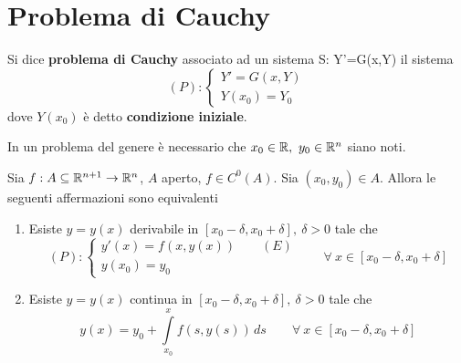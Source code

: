 \section{Problema di Cauchy}
\begin{definition}
    Si dice \textbf{problema di Cauchy} associato ad un sistema S: Y'=G(x,Y) il sistema
    \begin{equation*}
       (P): \begin{cases}
            Y'=G(x, Y)\\
            Y(x_0)=Y_0
        \end{cases}
    \end{equation*}
    dove $Y(x_0)$ è detto \textbf{condizione iniziale}.
\end{definition}
\begin{oss}
In un problema del genere è necessario che $x_0 \in \mathbb{R},\ y_0 \in \mathbb{R}^n$ siano noti.
\end{oss}
\begin{lemma} \label{Lemma: Formulazione integrale del problema di Cauchy}
    Sia $f: A \subseteq \mathbb{R}^{n+1} \to \mathbb{R}^n$, $A$ aperto, $f \in C^0(A)$. Sia $(x_0, y_0) \in A$. Allora le seguenti affermazioni sono equivalenti
    \begin{enumerate}
        \item Esiste $y=y(x)$ derivabile in $[x_0-\delta, x_0+\delta],\ \delta>0$ tale che 
        \begin{equation*}
            (P): \begin{cases}
                y'(x)=f(x, y(x)) \qquad (E)\\
                y(x_0)=y_0 
            \end{cases}
            \qquad \forall\ x \in [x_0-\delta, x_0+\delta]
        \end{equation*}
        \item Esiste $y=y(x)$ continua in $[x_0-\delta, x_0+\delta],\ \delta>0$ tale che 
        \begin{equation} \label{Eq: Equazione integrale di Volterra}
            y(x)= y_0 + \int\limits_{x_0}^{x}{f(s, y(s))}\, ds \qquad \forall\ x \in [x_0-\delta, x_0+\delta]
        \end{equation}
    \end{enumerate}
\end{lemma}
